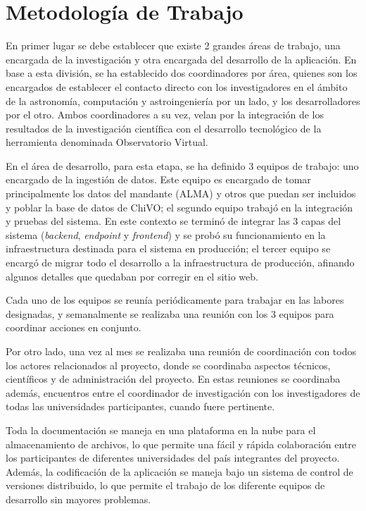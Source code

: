 \section{Metodología de Trabajo}

En primer lugar se debe establecer que existe 2 grandes áreas de trabajo, una encargada de la investigación y otra encargada del desarrollo de la aplicación. En base a esta división, se ha establecido dos coordinadores por área, quienes son los encargados de establecer el contacto directo con los investigadores en el ámbito de la astronomía, computación y astroingeniería por un lado, y los desarrolladores por el otro. Ambos coordinadores a su vez, velan por la integración de los resultados de la investigación científica con el desarrollo tecnológico de la herramienta denominada Observatorio Virtual.

En el área de desarrollo, para esta etapa, se ha definido 3 equipos de trabajo: uno encargado de la ingestión de datos. Este equipo es encargado de tomar principalmente los datos del mandante (ALMA) y otros que puedan ser incluidos y poblar la base de datos de ChiVO; el segundo equipo trabajó en la integración y pruebas del sistema. En este contexto se terminó de integrar las 3 capas del sistema (\emph{backend}, \emph{endpoint} y \emph{frontend}) y se probó su funcionamiento en la infraestructura destinada para el sistema en producción; el tercer equipo se encargó de migrar todo el desarrollo a la infraestructura de producción, afinando algunos detalles que quedaban por corregir en el sitio web.

Cada uno de los equipos se reunía periódicamente para trabajar en las labores designadas, y semanalmente se realizaba una reunión con los 3 equipos para coordinar acciones en conjunto.

Por otro lado, una vez al mes se realizaba una reunión de coordinación con todos los actores relacionados al proyecto, donde se coordinaba aspectos técnicos, científicos y de administración del proyecto. En estas reuniones se coordinaba además, encuentros entre el coordinador de investigación con los investigadores de todas las universidades participantes, cuando fuere pertinente.

Toda la documentación se maneja en una plataforma en la nube para el almacenamiento de archivos, lo que permite una fácil y rápida colaboración entre los participantes de diferentes universidades del país integrantes del proyecto. Además, la codificación de la aplicación se maneja bajo un sistema de control de versiones distribuido, lo que permite el trabajo de los diferente equipos de desarrollo sin mayores problemas.

